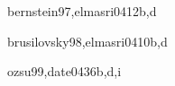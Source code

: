 \begin{syllabus}
\begin{unit}{\IMTransactionProcessing}{}{bernstein97,elmasri04}{12}{b,d}
    \IMTransactionProcessingAllTopics
    \IMTransactionProcessingAllLearningOutcomes
\end{unit}

\begin{unit}{\IMInformationStorageandRetrieval}{}{brusilovsky98,elmasri04}{10}{b,d}
    \IMInformationStorageandRetrievalAllTopics
    \IMInformationStorageandRetrievalAllLearningOutcomes
\end{unit}

\begin{unit}{\IMDistributedDatabases}{}{ozsu99,date04}{36}{b,d,i}
    \IMDistributedDatabasesAllTopics
    \IMDistributedDatabasesAllLearningOutcomes
\end{unit}

\begin{coursebibliography}
\end{coursebibliography}

\end{syllabus}

%
    